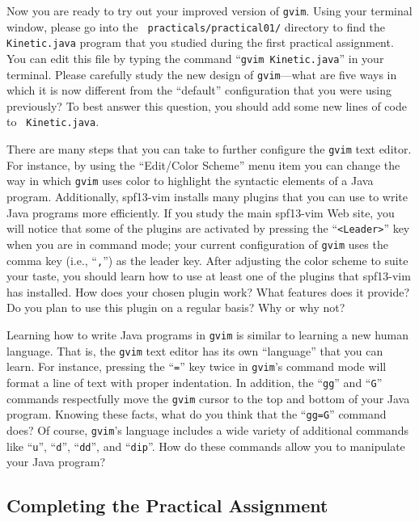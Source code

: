 Now you are ready to try out your improved version of {\tt gvim}.  Using your terminal window, please go into the {\tt
  practicals/practical01/} directory to find the {\tt Kinetic.java} program that you studied during the first practical
assignment. You can edit this file by typing the command ``{\tt gvim Kinetic.java}'' in your terminal. Please carefully
study the new design of {\tt gvim}---what are five ways in which it is now different from the ``default'' configuration
that you were using previously? To best answer this question, you should add some new lines of code to {\tt
  Kinetic.java}.

There are many steps that you can take to further configure the {\tt gvim} text editor.  For instance, by using the
``Edit/Color Scheme'' menu item you can change the way in which {\tt gvim} uses color to highlight the syntactic
elements of a Java program. Additionally, spf13-vim installs many plugins that you can use to write Java programs more
efficiently.  If you study the main spf13-vim Web site, you will notice that some of the plugins are activated by
pressing the ``{\tt <Leader>}'' key when you are in command mode; your current configuration of {\tt gvim} uses the
comma key (i.e., ``{\tt ,}'') as the leader key. After adjusting the color scheme to suite your taste, you should learn
how to use at least one of the plugins that spf13-vim has installed.  How does your chosen plugin work?  What features
does it provide? Do you plan to use this plugin on a regular basis? Why or why not?

Learning how to write Java programs in {\tt gvim} is similar to learning a new human language.  That is, the {\tt gvim}
text editor has its own ``language'' that you can learn.  For instance, pressing the ``{\tt =}'' key twice in {\tt gvim}'s
command mode will format a line of text with proper indentation.  In addition, the ``{\tt gg}'' and ``{\tt G}'' commands
respectfully move the {\tt gvim} cursor to the top and bottom of your Java program.  Knowing these facts, what do you
think that the ``{\tt gg=G}'' command does? Of course, {\tt gvim}'s language includes a wide variety of additional
commands like ``{\tt u}'', ``{\tt d}'', ``{\tt dd}'', and ``{\tt dip}''.  How do these commands allow you to manipulate
your Java program?

\vspace*{-.15in}
\subsection*{Completing the Practical Assignment}
\vspace*{-.1in}

